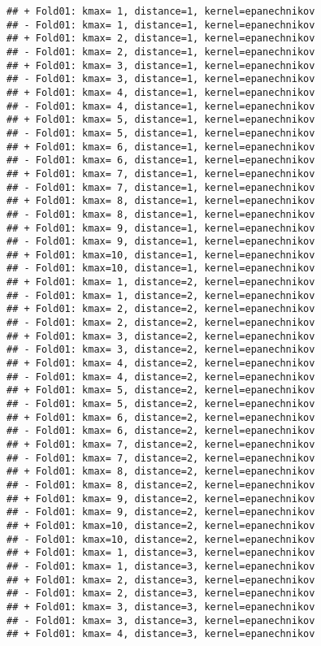 \documentclass[
]{article}
\begin{document}
\begin{verbatim}
## + Fold01: kmax= 1, distance=1, kernel=epanechnikov 
## - Fold01: kmax= 1, distance=1, kernel=epanechnikov 
## + Fold01: kmax= 2, distance=1, kernel=epanechnikov 
## - Fold01: kmax= 2, distance=1, kernel=epanechnikov 
## + Fold01: kmax= 3, distance=1, kernel=epanechnikov 
## - Fold01: kmax= 3, distance=1, kernel=epanechnikov 
## + Fold01: kmax= 4, distance=1, kernel=epanechnikov 
## - Fold01: kmax= 4, distance=1, kernel=epanechnikov 
## + Fold01: kmax= 5, distance=1, kernel=epanechnikov 
## - Fold01: kmax= 5, distance=1, kernel=epanechnikov 
## + Fold01: kmax= 6, distance=1, kernel=epanechnikov 
## - Fold01: kmax= 6, distance=1, kernel=epanechnikov 
## + Fold01: kmax= 7, distance=1, kernel=epanechnikov 
## - Fold01: kmax= 7, distance=1, kernel=epanechnikov 
## + Fold01: kmax= 8, distance=1, kernel=epanechnikov 
## - Fold01: kmax= 8, distance=1, kernel=epanechnikov 
## + Fold01: kmax= 9, distance=1, kernel=epanechnikov 
## - Fold01: kmax= 9, distance=1, kernel=epanechnikov 
## + Fold01: kmax=10, distance=1, kernel=epanechnikov 
## - Fold01: kmax=10, distance=1, kernel=epanechnikov 
## + Fold01: kmax= 1, distance=2, kernel=epanechnikov 
## - Fold01: kmax= 1, distance=2, kernel=epanechnikov 
## + Fold01: kmax= 2, distance=2, kernel=epanechnikov 
## - Fold01: kmax= 2, distance=2, kernel=epanechnikov 
## + Fold01: kmax= 3, distance=2, kernel=epanechnikov 
## - Fold01: kmax= 3, distance=2, kernel=epanechnikov 
## + Fold01: kmax= 4, distance=2, kernel=epanechnikov 
## - Fold01: kmax= 4, distance=2, kernel=epanechnikov 
## + Fold01: kmax= 5, distance=2, kernel=epanechnikov 
## - Fold01: kmax= 5, distance=2, kernel=epanechnikov 
## + Fold01: kmax= 6, distance=2, kernel=epanechnikov 
## - Fold01: kmax= 6, distance=2, kernel=epanechnikov 
## + Fold01: kmax= 7, distance=2, kernel=epanechnikov 
## - Fold01: kmax= 7, distance=2, kernel=epanechnikov 
## + Fold01: kmax= 8, distance=2, kernel=epanechnikov 
## - Fold01: kmax= 8, distance=2, kernel=epanechnikov 
## + Fold01: kmax= 9, distance=2, kernel=epanechnikov 
## - Fold01: kmax= 9, distance=2, kernel=epanechnikov 
## + Fold01: kmax=10, distance=2, kernel=epanechnikov 
## - Fold01: kmax=10, distance=2, kernel=epanechnikov 
## + Fold01: kmax= 1, distance=3, kernel=epanechnikov 
## - Fold01: kmax= 1, distance=3, kernel=epanechnikov 
## + Fold01: kmax= 2, distance=3, kernel=epanechnikov 
## - Fold01: kmax= 2, distance=3, kernel=epanechnikov 
## + Fold01: kmax= 3, distance=3, kernel=epanechnikov 
## - Fold01: kmax= 3, distance=3, kernel=epanechnikov 
## + Fold01: kmax= 4, distance=3, kernel=epanechnikov 

\end{verbatim}
\end{document}
